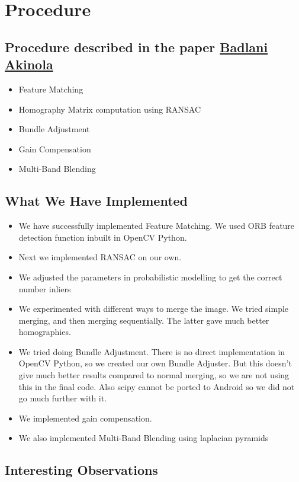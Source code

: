 \documentclass{article}
\begin{document}
\section*{Procedure}

\subsection*{Procedure described in the paper 
\href{https://stacks.stanford.edu/file/druid:bf950qp8995/Badlani_Akinola_Li.pdf}{Badlani Akinola}}

\begin{itemize}
\item Feature Matching
\item Homography Matrix computation using RANSAC
\item Bundle Adjustment
\item Gain Compensation
\item Multi-Band Blending
\end{itemize}

\subsection*{What We Have Implemented}

\begin{itemize}
\item We have successfully implemented Feature Matching. We used ORB feature detection function inbuilt in OpenCV Python.
\item Next we  implemented RANSAC on our own. 
\item We adjusted the parameters in probabilistic modelling to get the correct number inliers
\item We experimented with different ways to merge the image. We tried simple merging, and then merging sequentially. The latter gave much better homographies.
\item We tried doing Bundle Adjustment. There is no direct implementation in OpenCV Python, so we created our own Bundle Adjuster. But this doesn’t give much better results compared to normal merging, so we are not using this in the final code. Also scipy cannot be ported to Android so we did not go much further with it.
\item We implemented gain compensation.
\item We also implemented Multi-Band Blending using laplacian pyramids
\end{itemize}

\subsection*{Interesting Observations}
\end{document}
